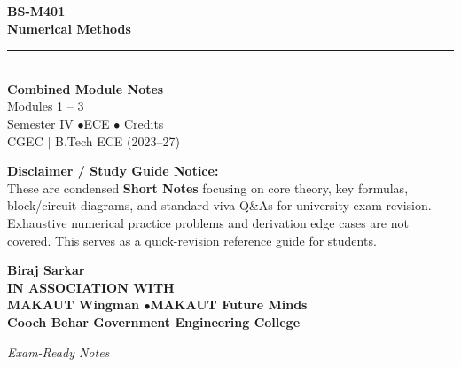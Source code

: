 \documentclass[12pt,a4paper]{article}
\begin{document}
\thispagestyle{empty}


\vspace*{1.0cm}
\begin{center}
  {\Huge\bfseries\color{myred} BS-M401}\\[10pt]
  {\LARGE\bfseries\color{mydark} Numerical Methods}\\[20pt]
  {\color{myred}\rule{0.7\linewidth}{1.5pt}}\\[18pt]
  {\Large\color{myteal}\textbf{Combined Module Notes}}\\[8pt]
  {\large\color{mydark} Modules 1 -- 3}\\[40pt]
  {\normalsize\color{mydark} Semester IV \quad$\bullet$\quad ECE \quad$\bullet$ Credits}\\[12pt]
  {\normalsize\color{mydark} CGEC \;$|$\; B.Tech ECE (2023--27)}
\end{center}
\vspace{1.0cm}
\begin{center}
  \begin{tcolorbox}[colback=mygray, colframe=mgframe, boxrule=0.5pt, arc=3pt, width=0.85\linewidth]
    \centering\small\color{mydark}
    \textbf{Disclaimer / Study Guide Notice:}\\
    These are condensed \textbf{Short Notes} focusing on core theory, key formulas, block/circuit diagrams, and standard viva Q\&As for university exam revision. Exhaustive numerical practice problems and derivation edge cases are not covered. This serves as a quick-revision reference guide for students.
  \end{tcolorbox}
\end{center}
\vfill
\vspace{0.6cm}
\begin{center}
  {\large\bfseries\color{mypurple} Biraj Sarkar}\\[16pt]
  {\footnotesize\color{watermark}\textbf{IN ASSOCIATION WITH}}\\[8pt]
  {\small\bfseries\color{mydark} MAKAUT Wingman \quad$\bullet$\quad MAKAUT Future Minds}\\[12pt]
  {\large\bfseries\color{myteal} Cooch Behar Government Engineering College}
\end{center}
\vfill
\begin{center}{\small\color{watermark}\textit{Exam-Ready Notes}}\end{center}
\clearpage
\end{document}
